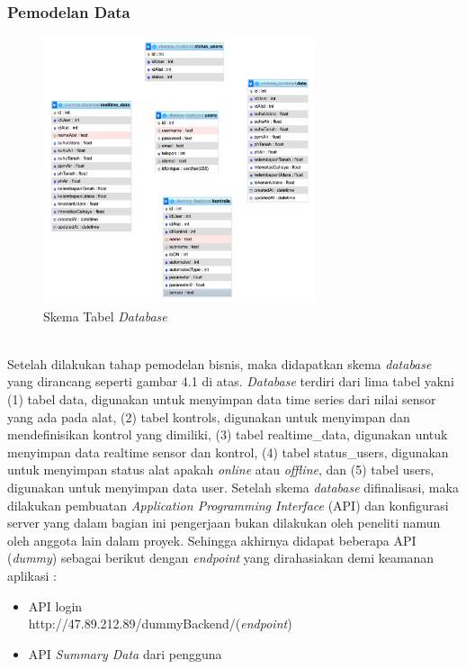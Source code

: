 \begin{flushleft}
\begin{justify}
        \subsubsection{Pemodelan Data}
        \begin{figure}[ht]
            \centering
            \includegraphics[width=8cm]{images/database.png}
            \caption{Skema Tabel \textit{Database}}
        \end{figure}
        \noindent \\Setelah dilakukan tahap pemodelan bisnis, maka didapatkan skema \emph{database} yang dirancang seperti gambar 4.1 di atas. \emph{Database} terdiri dari lima tabel yakni (1) tabel data, digunakan untuk menyimpan data time series dari nilai sensor yang ada pada alat, 
        (2) tabel kontrols, digunakan untuk menyimpan dan mendefinisikan kontrol yang dimiliki, 
        (3) tabel realtime\_data, digunakan untuk menyimpan data realtime sensor dan kontrol,
        (4) tabel status\_users, digunakan untuk menyimpan status alat apakah \emph{online} atau \emph{offline},
        dan (5) tabel users, digunakan untuk menyimpan data user. Setelah skema \emph{database} difinalisasi, 
        maka dilakukan pembuatan \emph{Application Programming Interface} (API) dan konfigurasi server yang dalam bagian ini 
        pengerjaan bukan dilakukan oleh peneliti namun oleh anggota lain dalam proyek. 
        Sehingga akhirnya didapat beberapa API (\emph{dummy}) sebagai berikut dengan \emph{endpoint} yang dirahasiakan demi keamanan aplikasi :
            \begin{itemize}
                \item API login\\
                http://47.89.212.89/dummyBackend/(\emph{endpoint})
                \item API \emph{Summary Data} dari pengguna\\

\end{itemize}
\end{justify}
\end{flushleft}
